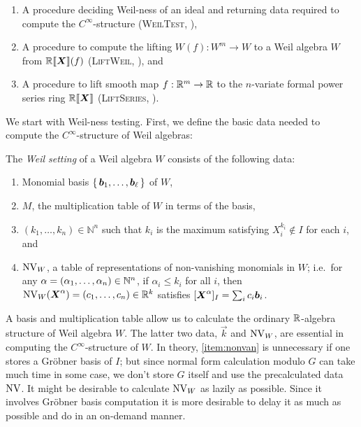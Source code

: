 \documentclass[runningheads]{llncs}
\begin{document}
\begin{enumerate}
  \item A procedure deciding Weil-ness of an ideal and returning data required to compute the $C^\infty$-structure (\textsc{WeilTest}, ),
  \item A procedure to compute the lifting  $W(f): W^m \to W$ to a Weil algebra $W$ from $\mathord{\mathbb{R}\llbracket\boldsymbol{X}\rrbracket}(f)$ (\textsc{LiftWeil}, ), and
  \item A procedure to lift smooth map $f: \mathbb{R}^m \to \mathbb{R}$ to the $n$-variate formal power series ring $\mathord{\mathbb{R}\llbracket\boldsymbol{X}\rrbracket}$ (\textsc{LiftSeries}, ).\label{step:lift-series}
\end{enumerate}

We start with Weil-ness testing.
First, we define the basic data needed to compute the $C^\infty$-structure of Weil algebras:

\begin{definition}
  The \emph{Weil setting} of a Weil algebra $W$ consists of the following data:
  \begin{enumerate}[ref=(\arabic*)]
    \item Monomial basis $\set{\boldsymbol{b}_1, \dots, \boldsymbol{b}_\ell}$ of $W$,
    \item $M$, the multiplication table of $W$ in terms of the basis,
    \item $(k_1, \dots, k_n) \in \mathbb{N}^n$ such that $k_i$ is the maximum satisfying $X_i^{k_i} \notin I$ for each $i$, and
    \item $\operatorname{NV}_W$, a table of representations of non-vanishing monomials in $W$;
    i.e.\ for any $\alpha = (\alpha_1, \dots, \alpha_n) \in \mathbb{N}^n$, if $\alpha_i \leq k_i$ for all $i$, then $\operatorname{NV}_W(\boldsymbol{X}^\alpha) = (c_1, \dots, c_n) \in \mathbb{R}^k$ satisfies $[\boldsymbol{X}^\alpha]_I = \sum_i c_i \boldsymbol{b}_i$.\label{item:nonvan}
  \end{enumerate}
\end{definition}

A basis and multiplication table allow us to calculate the ordinary $\mathbb{R}$-algebra structure of Weil algebra $W$.
The latter two data, $\vec{k}$ and $\operatorname{NV}_W$, are essential in computing the $C^\infty$-structure of $W$.
In theory, \ref{item:nonvan} is unnecessary if one stores a Gr\"{o}bner basis of $I$;
but since normal form calculation modulo $G$ can take much time in some case, we don't store $G$ itself and use the precalculated data $\operatorname{NV}$.
It might be desirable to calculate $\operatorname{NV}_W$ as lazily as possible.
Since it involves Gr\"{o}bner basis computation it is more desirable to delay it as much as possible and do in an on-demand manner.
\end{document}

